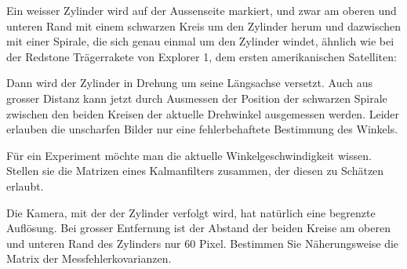 Ein weisser Zylinder wird auf der Aussenseite markiert, und zwar
am oberen und unteren Rand mit einem schwarzen Kreis um den Zylinder
herum und dazwischen mit einer Spirale, die sich genau einmal
um den Zylinder windet, ähnlich wie bei der Redstone Trägerrakete von
Explorer 1, dem ersten amerikanischen Satelliten:
\begin{center}
\end{center}
Dann wird der Zylinder in Drehung um seine Längsachse versetzt.
Auch aus grosser Distanz kann jetzt durch Ausmessen der Position
der schwarzen Spirale zwischen den beiden Kreisen der aktuelle Drehwinkel
ausgemessen werden. Leider erlauben die unscharfen Bilder nur
eine fehlerbehaftete Bestimmung des Winkels.
\begin{teilaufgaben}
\item
Für ein Experiment
möchte man die aktuelle Winkelgeschwindigkeit wissen.
Stellen sie die Matrizen eines Kalmanfilters zusammen, der
diesen zu Schätzen erlaubt.
\item
Die Kamera, mit der der Zylinder verfolgt wird, hat natürlich eine
begrenzte Auflösung. Bei grosser Entfernung ist der Abstand der
beiden Kreise am oberen und unteren Rand des Zylinders nur 60 Pixel.
Bestimmen Sie Näherungsweise die Matrix der Messfehlerkovarianzen.
\end{teilaufgaben}

